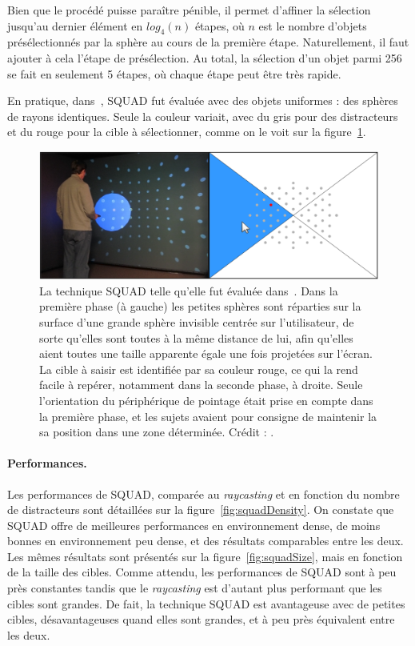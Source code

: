 	Bien que le procédé puisse paraître pénible, il permet d'affiner la sélection jusqu'au dernier élément en $log_{4}(n)$ étapes, où $n$ est le nombre d'objets présélectionnés par la sphère au cours de la première étape. Naturellement, il faut ajouter à cela l'étape de présélection. Au total, la sélection d'un objet parmi 256 se fait en seulement 5 étapes, où chaque étape peut être très rapide.
	
	En pratique, dans~\cite{kopper2011rapid}, SQUAD fut évaluée avec des objets uniformes : des sphères de rayons identiques. Seule la couleur variait, avec du gris pour des distracteurs et du rouge pour la cible à sélectionner, comme on le voit sur la figure~\ref{fig:squad2}. 
	
	\begin{figure}[H]
		\centering
		\includegraphics[width=\textwidth]{figures/ch2/squad2}
		\caption[La technique SQUAD --- évaluation]{La technique SQUAD telle qu'elle fut évaluée dans~\cite{kopper2011rapid}. Dans la première phase (à gauche) les petites sphères sont réparties sur la surface d'une grande sphère invisible centrée sur l'utilisateur, de sorte qu'elles sont toutes à la même distance de lui, afin qu'elles aient toutes une taille apparente égale une fois projetées sur l'écran. La cible à saisir est identifiée par sa couleur rouge, ce qui la rend facile à repérer, notamment dans la seconde phase, à droite. Seule l'orientation du périphérique de pointage était prise en compte dans la première phase, et les sujets avaient pour consigne de maintenir la sa position dans une zone déterminée. Crédit : \cite{kopper2011rapid}.}
		\label{fig:squad2}
	\end{figure}
	
	\paragraph{Performances.}
	Les performances de SQUAD, comparée au \emph{raycasting} et en fonction du nombre de distracteurs sont détaillées sur la figure~\ref{fig:squadDensity}. On constate que SQUAD offre de meilleures performances en environnement dense, de moins bonnes en environnement peu dense, et des résultats comparables entre les deux. Les mêmes résultats sont présentés sur la figure~\ref{fig:squadSize}, mais en fonction de la taille des cibles. Comme attendu, les performances de SQUAD sont à peu près constantes tandis que le \emph{raycasting} est d'autant plus performant que les cibles sont grandes. De fait, la technique SQUAD est avantageuse avec de petites cibles, désavantageuses quand elles sont grandes, et à peu près équivalent entre les deux.
	

